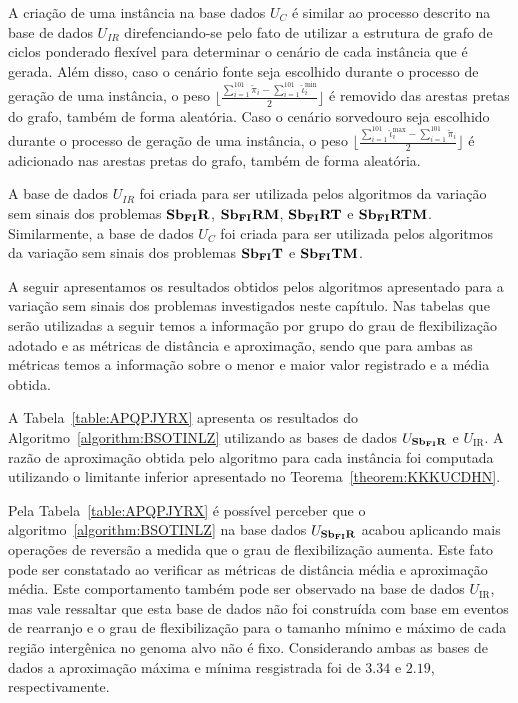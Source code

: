 A criação de uma instância na base dados $U_{C}$ é similar ao processo descrito na base de dados $U_{IR}$ direfenciando-se pelo fato de utilizar a estrutura de grafo de ciclos ponderado flexível para determinar o cenário de cada instância que é gerada. Além disso, caso o cenário fonte seja escolhido durante o processo de geração de uma instância, o peso $\lfloor\frac{\sum_{i = 1}^{101}\breve\pi_i - \sum_{i = 1}^{101}\breve\iota^{\min}_i}{2}\rfloor$ é removido das arestas pretas do grafo, também de forma aleatória. Caso o cenário sorvedouro seja escolhido durante o processo de geração de uma instância, o peso $\lfloor\frac{\sum_{i = 1}^{101}\breve\iota^{\max}_i - \sum_{i = 1}^{101}\breve\pi_i}{2}\rfloor$ é adicionado nas arestas pretas do grafo, também de forma aleatória. 

A base de dados $U_{IR}$ foi criada para ser utilizada pelos algoritmos da variação sem sinais dos problemas $\textbf{Sb\textsubscript{FI}R}{}$, $\textbf{Sb\textsubscript{FI}RM}{}$, $\textbf{Sb\textsubscript{FI}RT}{}$ e $\textbf{Sb\textsubscript{FI}RTM}{}$. Similarmente, a base de dados $U_{C}$ foi criada para ser utilizada pelos algoritmos da variação sem sinais dos problemas $\textbf{Sb\textsubscript{FI}T}{}$ e $\textbf{Sb\textsubscript{FI}TM}{}$.

A seguir apresentamos os resultados obtidos pelos algoritmos apresentado para a variação sem sinais dos problemas investigados neste capítulo. Nas tabelas que serão utilizadas a seguir temos a informação por grupo do grau de flexibilização adotado e as métricas de distância e aproximação, sendo que para ambas as métricas temos a informação sobre o menor e maior valor registrado e a média obtida.

A Tabela~\ref{table:APQPJYRX} apresenta os resultados do Algoritmo~\ref{algorithm:BSOTINLZ} utilizando as bases de dados $U_{\textbf{Sb\textsubscript{FI}R}}{}$ e $U_{\text{IR}}$. A razão de aproximação obtida pelo algoritmo para cada instância foi computada utilizando o limitante inferior apresentado no Teorema~\ref{theorem:KKKUCDHN}.



% 

Pela Tabela~\ref{table:APQPJYRX} é possível perceber que o algoritmo~\ref{algorithm:BSOTINLZ} na base dados $U_{\textbf{Sb\textsubscript{FI}R}}{}$ acabou aplicando mais operações de reversão a medida que o grau de flexibilização aumenta. Este fato pode ser constatado ao verificar as métricas de distância média e aproximação média. Este comportamento também pode ser observado na base de dados $U_{\text{IR}}$, mas vale ressaltar que esta base de dados não foi construída com base em eventos de rearranjo e o grau de flexibilização para o tamanho mínimo e máximo de cada região intergênica no genoma alvo não é fixo. Considerando ambas as bases de dados a aproximação máxima e mínima resgistrada foi de $3.34$ e $2.19$, respectivamente.


